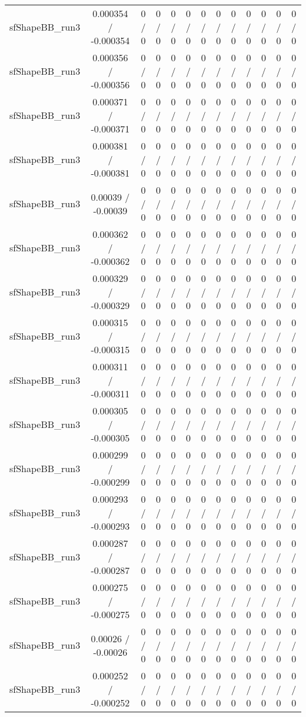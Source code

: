 \documentclass[10pt]{article}
\begin{document}
\begin{table}[htbp]
\begin{center}
\begin{tabular}{|c|c|c|c|c|c|c|c|c|c|c|c|c|}
  sfShapeBB_run3 & 0.000354 / -0.000354 & 0 / 0 & 0 / 0 & 0 / 0 & 0 / 0 & 0 / 0 & 0 / 0 & 0 / 0 & 0 / 0 & 0 / 0 & 0 / 0 & 0 / 0 \\ 
  sfShapeBB_run3 & 0.000356 / -0.000356 & 0 / 0 & 0 / 0 & 0 / 0 & 0 / 0 & 0 / 0 & 0 / 0 & 0 / 0 & 0 / 0 & 0 / 0 & 0 / 0 & 0 / 0 \\ 
  sfShapeBB_run3 & 0.000371 / -0.000371 & 0 / 0 & 0 / 0 & 0 / 0 & 0 / 0 & 0 / 0 & 0 / 0 & 0 / 0 & 0 / 0 & 0 / 0 & 0 / 0 & 0 / 0 \\ 
  sfShapeBB_run3 & 0.000381 / -0.000381 & 0 / 0 & 0 / 0 & 0 / 0 & 0 / 0 & 0 / 0 & 0 / 0 & 0 / 0 & 0 / 0 & 0 / 0 & 0 / 0 & 0 / 0 \\ 
  sfShapeBB_run3 & 0.00039 / -0.00039 & 0 / 0 & 0 / 0 & 0 / 0 & 0 / 0 & 0 / 0 & 0 / 0 & 0 / 0 & 0 / 0 & 0 / 0 & 0 / 0 & 0 / 0 \\ 
  sfShapeBB_run3 & 0.000362 / -0.000362 & 0 / 0 & 0 / 0 & 0 / 0 & 0 / 0 & 0 / 0 & 0 / 0 & 0 / 0 & 0 / 0 & 0 / 0 & 0 / 0 & 0 / 0 \\ 
  sfShapeBB_run3 & 0.000329 / -0.000329 & 0 / 0 & 0 / 0 & 0 / 0 & 0 / 0 & 0 / 0 & 0 / 0 & 0 / 0 & 0 / 0 & 0 / 0 & 0 / 0 & 0 / 0 \\ 
  sfShapeBB_run3 & 0.000315 / -0.000315 & 0 / 0 & 0 / 0 & 0 / 0 & 0 / 0 & 0 / 0 & 0 / 0 & 0 / 0 & 0 / 0 & 0 / 0 & 0 / 0 & 0 / 0 \\ 
  sfShapeBB_run3 & 0.000311 / -0.000311 & 0 / 0 & 0 / 0 & 0 / 0 & 0 / 0 & 0 / 0 & 0 / 0 & 0 / 0 & 0 / 0 & 0 / 0 & 0 / 0 & 0 / 0 \\ 
  sfShapeBB_run3 & 0.000305 / -0.000305 & 0 / 0 & 0 / 0 & 0 / 0 & 0 / 0 & 0 / 0 & 0 / 0 & 0 / 0 & 0 / 0 & 0 / 0 & 0 / 0 & 0 / 0 \\ 
  sfShapeBB_run3 & 0.000299 / -0.000299 & 0 / 0 & 0 / 0 & 0 / 0 & 0 / 0 & 0 / 0 & 0 / 0 & 0 / 0 & 0 / 0 & 0 / 0 & 0 / 0 & 0 / 0 \\ 
  sfShapeBB_run3 & 0.000293 / -0.000293 & 0 / 0 & 0 / 0 & 0 / 0 & 0 / 0 & 0 / 0 & 0 / 0 & 0 / 0 & 0 / 0 & 0 / 0 & 0 / 0 & 0 / 0 \\ 
  sfShapeBB_run3 & 0.000287 / -0.000287 & 0 / 0 & 0 / 0 & 0 / 0 & 0 / 0 & 0 / 0 & 0 / 0 & 0 / 0 & 0 / 0 & 0 / 0 & 0 / 0 & 0 / 0 \\ 
  sfShapeBB_run3 & 0.000275 / -0.000275 & 0 / 0 & 0 / 0 & 0 / 0 & 0 / 0 & 0 / 0 & 0 / 0 & 0 / 0 & 0 / 0 & 0 / 0 & 0 / 0 & 0 / 0 \\ 
  sfShapeBB_run3 & 0.00026 / -0.00026 & 0 / 0 & 0 / 0 & 0 / 0 & 0 / 0 & 0 / 0 & 0 / 0 & 0 / 0 & 0 / 0 & 0 / 0 & 0 / 0 & 0 / 0 \\ 
  sfShapeBB_run3 & 0.000252 / -0.000252 & 0 / 0 & 0 / 0 & 0 / 0 & 0 / 0 & 0 / 0 & 0 / 0 & 0 / 0 & 0 / 0 & 0 / 0 & 0 / 0 & 0 / 0 \\ 

\end{tabular}
\end{center}
\end{table}
\end{document}
